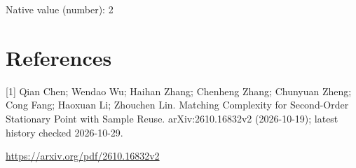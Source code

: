 \documentclass[10pt,a4paper]{article}
\begin{document}
Native value (number): 2

\section{References}
[1] Qian Chen; Wendao Wu; Haihan Zhang; Chenheng Zhang; Chunyuan Zheng; Cong Fang; Haoxuan Li; Zhouchen Lin. Matching Complexity for Second-Order Stationary Point with Sample Reuse. arXiv:2610.16832v2 (2026-10-19); latest history checked 2026-10-29.

\url{https://arxiv.org/pdf/2610.16832v2}
\end{document}
